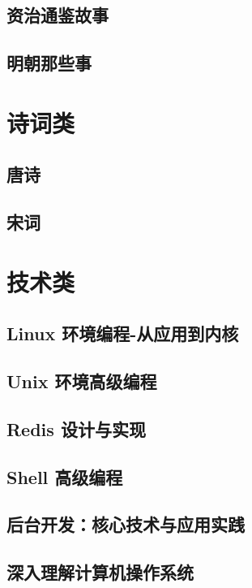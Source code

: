 \documentclass[UTF8,a4paper,12pt]{ctexbook}
\begin{document}
	\section{资治通鉴故事}
	
	\section{明朝那些事}

\chapter{诗词类}
	\section{唐诗}

	\section{宋词}


\chapter{技术类} 
	\section{Linux 环境编程-从应用到内核}
	
	\section{Unix 环境高级编程}

	\section{Redis 设计与实现}
	
	\section{Shell 高级编程}
	
	\section{后台开发：核心技术与应用实践}
	
	\section{深入理解计算机操作系统}
	
\end{document}
